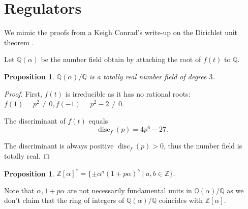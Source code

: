 \documentclass[a4paper]{article}
\newtheorem{Prop}[Thm]{Proposition}
\newcommand{\Q}{\mathbb{Q}}        %
\DeclareMathOperator{\disc}{disc}        %
\begin{document}
\section{Regulators}
We mimic the proofs from a Keigh Conrad's write-up on the Dirichlet unit theorem \cite{conraddirichlet}.


Let $\Q(\alpha)$ be the number field obtain by attaching the root of $f(t)$ to $\Q$.
\begin{Prop}
$\Q(\alpha) / \Q$ is a totally real number field of degree $3$.
\end{Prop}

\begin{proof}
First, $f(t)$ is irreducible as it has no rational roots: $f(1) = p^2 \ne 0, f(-1) = p^2 - 2 \ne 0 $.

The discriminant of $f(t)$ equals
$$\disc_f(p) = 4 p^6 - 27 .$$

The discriminant is always positive $\disc_f(p) > 0$, thus the number field is totally real.
\end{proof}


\begin{Prop}
\label{prop_multiplicative_group_structure}
$\mathbb{Z}[\alpha]^{*} = \{ \pm \alpha^a (1 + p \alpha)^b \mid a, b \in \mathbb{Z} \} $.
\end{Prop}

Note that $\alpha, 1 + p \alpha$ are not necessarily fundamental units in $\Q(\alpha)/\Q$ as we don't claim that the ring of integers of $\Q(\alpha) / \Q$ coincides with $\mathbb{Z}[\alpha]$.
\end{document}
